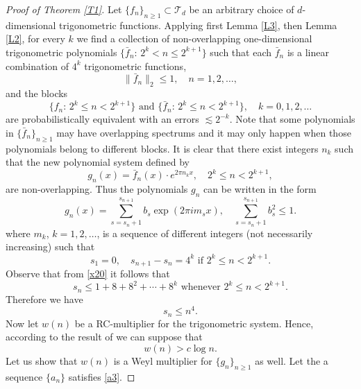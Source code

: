 \documentclass[12pt,reqno,fleqn]{amsart}
\theoremstyle{plain} %
\theoremstyle{remark}
\def\zT{\ensuremath{\mathscr T}}
\theoremstyle{plain}
\numberwithin{equation}{section}
\newcommand {\e }[1]{\eqref{#1}}
\newcommand {\lem }[1]{Lemma \ref{#1}}
\newcommand {\trm }[1]{Theorem \ref{#1}}
\begin{document}
\begin{proof}[Proof of \trm{T1}]
	Let $\{f_n\}_{n\ge 1}\subset \zT_d$ be an arbitrary choice of $d$-dimensional trigonometric functions. Applying first \lem{L3}, then \lem{L2}, for every $k$ we find a collection of non-overlapping one-dimensional trigonometric polynomials $ \{\bar f_n:\, 2^k<n\le 2^{k+1}\}$ such that each $\bar f_n$ is a linear combination of $4^k$ trigonometric functions, 
\begin{equation*}
		\|\bar f_n\|_2\le 1, \quad n=1,2,\ldots,
\end{equation*}
and the blocks 
	\begin{equation}\label{x14}
		\{f_n:\, 2^k\le n<2^{k+1}\} \text{ and } \{\bar f_n:\, 2^k\le n <2^{k+1}\},\quad k=0,1,2,\ldots
	\end{equation}
are  probabilistically equivalent with an errors $\lesssim 2^{-k}$. Note that some polynomials in $\{\bar f_n\}_{n\ge1}$ may have overlapping spectrums and it may only happen when those polynomials belong to different blocks. It is clear that there exist integers $n_k$ such that the new polynomial system defined by  
\begin{equation}\label{x13}
	g_n(x)=\bar f_n(x)\cdot e^{2\pi n_kx},\quad 2^k\le n <2^{k+1},
\end{equation}
are non-overlapping. Thus the polynomials $g_n$ can be written in the form 
\begin{equation}\label{x23}
	g_n(x)=\sum_{s=s_n+1}^{s_{n+1}}b_s \exp(2\pi i m_sx),\quad \sum_{s=s_n+1}^{s_{n+1}}b_s^2\le 1.
\end{equation}
where $m_k$, $k=1,2,\ldots$, is a sequence of different integers (not necessarily increasing) such that
\begin{equation}\label{x20}
s_1=0,\quad s_{n+1}-s_n= 4^k\text{ if }2^k\le n<2^{k+1}.
\end{equation}
Observe that from \e{x20} it follows that
\begin{equation}
	s_{n}\le 1+8+8^2+\cdots+8^k\text{ whenever }2^k\le n<2^{k+1}.
\end{equation}
Therefore we have
\begin{equation}\label{x21}
	s_n\le n^4.
\end{equation}
Now let $w(n)$ be a RC-multiplier for the trigonometric system.  Hence, according to the result of  \cite{Kar2} we can suppose that 
\begin{equation}\label{x22}
	w(n)>c\log n. 
\end{equation}
Let us show that $w(n)$ is a Weyl multiplier for $\{g_n\}_{n\ge1}$ as well. Let the a sequence $\{a_n\}$ satisfies \e{a3}.

\end{proof}
\end{document}
